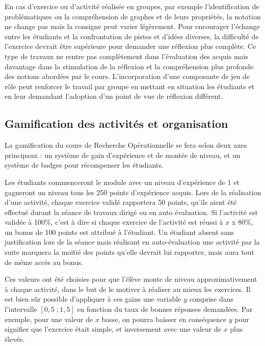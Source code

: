 En cas d'exercice ou d'activité réalisée en groupes, par exemple l'identification de problématiques ou la compréhension de graphes et de leurs propriétés, la notation ne change pas mais la consigne peut varier légèrement. Pour encourager l'échange entre les étudiants et la confrontation de pistes et d'idées diverses, la difficulté de l'exercice devrait être supérieure pour demander une réflexion plus complète. Ce type de travaux ne rentre pas complètement dans l'évaluation des acquis mais davantage dans la stimulation de la réflexion et la compréhension plus profonde des notions abordées par le cours. L'incorporation d'une composante de jeu de rôle peut renforcer le travail par groupe en mettant en situation les étudiants et en leur demandant l'adoption d'un point de vue de réflexion différent. 

\subsection{Gamification des activités et organisation}
La gamification du cours de Recherche Opérationnelle se fera selon deux axes principaux : un système de gain d'expérience et de montée de niveau, et un système de badges pour récompenser les étudiants. \par

Les étudiants commenceront le module avec un niveau d'expérience de 1 et gagneront un niveau tous les 250 points d'expérience acquis. Lors de la réalisation d'une activité, chaque exercice validé rapportera 50 points, qu'ils aient été effectué durant la séance de travaux dirigé ou en auto évaluation. Si l'activité est validée à 100\%, c'est à dire si chaque exercice de l'activité est réussi à $x$ x 80\%, un bonus de 100 points est attribué à l'étudiant. Un étudiant absent sans justification lors de la séance mais réalisant en auto-évaluation une activité par la suite marquera la moitié des points qu'elle devrait lui rapporter, mais aura tout de même accès au bonus. \par

Ces valeurs ont été choisies pour que l'élève monte de niveau approximativement à chaque activité, dans le but de le motiver à réaliser au mieux les exercices. Il est bien sûr possible d'appliquer à ces gains une variable $y$ comprise dans l'intervalle $[0,5\;;1,5]$ en fonction du taux de bonnes réponses demandées. Par exemple, pour une valeur de $x$ basse, on pourra baisser en conséquence $y$ pour signifier que l'exercice était simple, et inversement avec une valeur de $x$ plus élevée. \par

